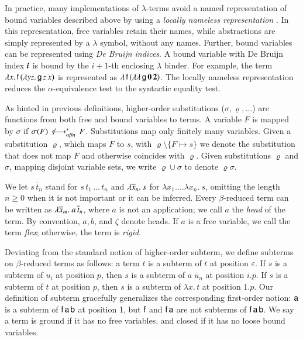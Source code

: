 In practice, many implementations of $\lambda$-terms avoid a named representation
of bound variables described above by using a \emph{locally nameless
representation} \cite{ac-12-locally-nameless}. In this representation, free
variables retain their names, while abstractions are simply represented by a
$\lambda$ symbol, without any names. Further, bound variables can be represented
using \emph{De Bruijn indices}. A bound variable with De Bruijn index
$\textbf{\textit{i}}$ is bound by the $i+1$-th enclosing $\lambda$ binder. For example,
the term $\lambda x. \, \mathsf{f} \, (\lambda y z. \, \mathsf{g} \, z \, x)$ is represented
as $\lambda\, \mathsf{f} \, (\lambda \lambda\, \mathsf{g} \, \mathbf{0} \, \mathbf{2})$.
The locally nameless representation reduces the $\alpha$-equivalence test to 
the syntactic equality test. 

As hinted in previous definitions, higher-order substitutions
($\sigma,\varrho,\ldots$) are functions from both free and bound variables to
terms. A variable $F$ is mapped by $\sigma$ if $ \sigma(F)\,\not\longleftrightarrow^*_{\alpha\beta\eta}\,F$.
Substitutions map only finitely many variables. Given a substitution $\varrho$,
which maps $F$ to $s$, with $\varrho\setminus\{F \mapsto s\}$ we denote the
substitution that does not map $F$ and otherwise coincides with $\varrho$. Given
substitutions $\varrho$ and $\sigma$, mapping disjoint variable sets, we write
$\varrho \cup \sigma$ to denote $\varrho\sigma$.

We let $s \, \overline{t}_n$ stand for $s \, t_1 \, \ldots \, t_n$
and $\lambda \overline{x}_n.\> s$ for $\lambda x_1. \ldots \lambda x_n. \> s$,
omitting the length $n \geq 0$ when it is not important or it can be inferred. Every
$\beta$-reduced term can be written as $\lambda \overline{x}_{m}.\> a \, \overline{t}_{n}$,
where $a$ is not an application; we call $a$ the \emph{head} of the term. By
convention, $a, b$, and $\zeta$ denote heads. If $a$ is a free variable, we call the term
\emph{flex}; otherwise, the term is \emph{rigid}.

Deviating from the standard notion of higher-order subterm, we define subterms
on $\beta$-reduced terms as follows: a term $t$ is a subterm of $t$ at position
$\varepsilon$. If $s$ is a subterm of $u_i$ at position $p$, then $s$ is a
subterm of $a\;\overline{u}_n$ at position $i.p$. If $s$ is a subterm of $t$ at
position $p$, then $s$ is a subterm of $\lambda x.\, t$ at position $1.p$. Our
definition of subterm gracefully generalizes the corresponding first-order
notion: $\mathsf{a}$ is a subterm of $\mathsf{f} \, \mathsf{a} \, \mathsf{b}$ at position 1,
but $\mathsf{f}$ and $\mathsf{f} \, \mathsf{a}$ are not subterms of $\mathsf{f} \, \mathsf{a}
\, \mathsf{b}$. We say a term is ground if it has no free variables, and closed
if it has no loose bound variables.


